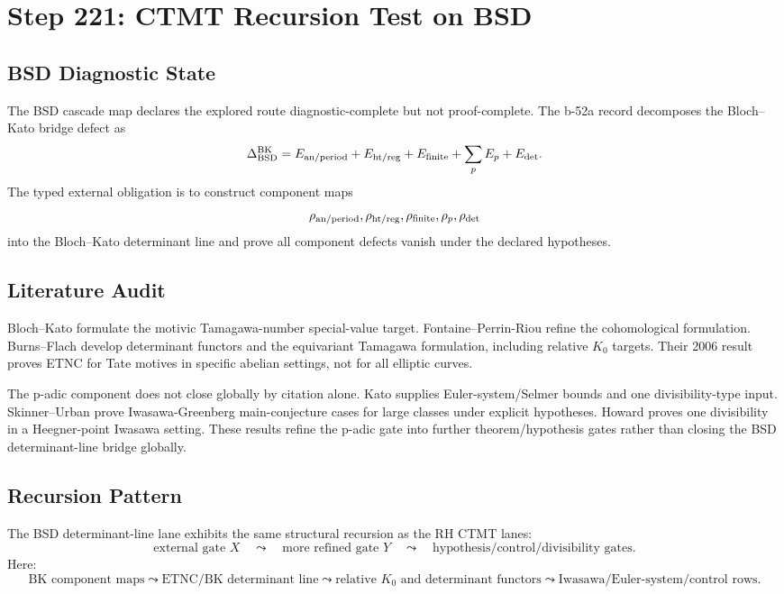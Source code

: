 \documentclass[11pt]{article}
\begin{document}
\section*{Step 221: CTMT Recursion Test on BSD}

\subsection*{BSD Diagnostic State}

The BSD cascade map declares the explored route diagnostic-complete but not proof-complete.  The b-52a record decomposes the Bloch--Kato bridge defect as
\[
\Delta_{\rm BSD}^{\rm BK}
=E_{\rm an/period}+E_{\rm ht/reg}+E_{\rm finite}+\sum_p E_p+E_{\rm det}.
\]
The typed external obligation is to construct component maps
\[
\rho_{\rm an/period},\rho_{\rm ht/reg},\rho_{\rm finite},\rho_p,\rho_{\rm det}
\]
into the Bloch--Kato determinant line and prove all component defects vanish under the declared hypotheses.

\subsection*{Literature Audit}

Bloch--Kato formulate the motivic Tamagawa-number special-value target.  Fontaine--Perrin-Riou refine the cohomological formulation.  Burns--Flach develop determinant functors and the equivariant Tamagawa formulation, including relative \(K_0\) targets.  Their 2006 result proves ETNC for Tate motives in specific abelian settings, not for all elliptic curves.

The p-adic component does not close globally by citation alone.  Kato supplies Euler-system/Selmer bounds and one divisibility-type input.  Skinner--Urban prove Iwasawa-Greenberg main-conjecture cases for large classes under explicit hypotheses.  Howard proves one divisibility in a Heegner-point Iwasawa setting.  These results refine the p-adic gate into further theorem/hypothesis gates rather than closing the BSD determinant-line bridge globally.

\subsection*{Recursion Pattern}

The BSD determinant-line lane exhibits the same structural recursion as the RH CTMT lanes:
\[
\text{external gate }X
\quad\leadsto\quad
\text{more refined gate }Y
\quad\leadsto\quad
\text{hypothesis/control/divisibility gates}.
\]
Here:
\[
\text{BK component maps}
\leadsto
\text{ETNC/BK determinant line}
\leadsto
\text{relative }K_0\text{ and determinant functors}
\leadsto
\text{Iwasawa/Euler-system/control rows}.
\]
\end{document}
